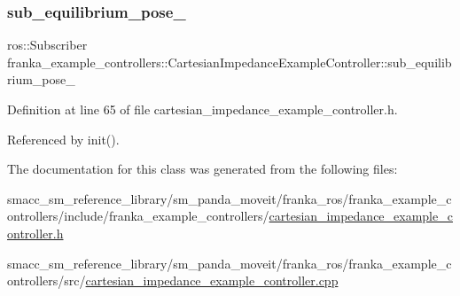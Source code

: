 \subsubsection{\texorpdfstring{sub\+\_\+equilibrium\+\_\+pose\+\_\+}{sub\_equilibrium\_pose\_}}
{\footnotesize\ttfamily ros\+::\+Subscriber franka\+\_\+example\+\_\+controllers\+::\+Cartesian\+Impedance\+Example\+Controller\+::sub\+\_\+equilibrium\+\_\+pose\+\_\+\hspace{0.3cm}{\ttfamily [private]}}



Definition at line 65 of file cartesian\+\_\+impedance\+\_\+example\+\_\+controller.\+h.



Referenced by init().



The documentation for this class was generated from the following files\+:\begin{DoxyCompactItemize}
\item 
smacc\+\_\+sm\+\_\+reference\+\_\+library/sm\+\_\+panda\+\_\+moveit/franka\+\_\+ros/franka\+\_\+example\+\_\+controllers/include/franka\+\_\+example\+\_\+controllers/\hyperlink{cartesian__impedance__example__controller_8h}{cartesian\+\_\+impedance\+\_\+example\+\_\+controller.\+h}\item 
smacc\+\_\+sm\+\_\+reference\+\_\+library/sm\+\_\+panda\+\_\+moveit/franka\+\_\+ros/franka\+\_\+example\+\_\+controllers/src/\hyperlink{cartesian__impedance__example__controller_8cpp}{cartesian\+\_\+impedance\+\_\+example\+\_\+controller.\+cpp}\end{DoxyCompactItemize}
